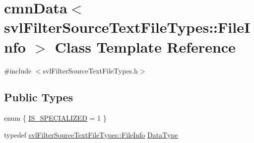 \hypertarget{classcmn_data_3_01svl_filter_source_text_file_types_1_1_file_info_01_4}{}\section{cmn\+Data$<$ svl\+Filter\+Source\+Text\+File\+Types\+:\+:File\+Info $>$ Class Template Reference}
\label{classcmn_data_3_01svl_filter_source_text_file_types_1_1_file_info_01_4}


{\ttfamily \#include $<$svl\+Filter\+Source\+Text\+File\+Types.\+h$>$}

\subsection*{Public Types}
\begin{DoxyCompactItemize}
\item 
enum \{ \hyperlink{classcmn_data_3_01svl_filter_source_text_file_types_1_1_file_info_01_4_ac2667a1a418e7039c6152d3106926eabaa76bfad2562771d868ca2393ab1d17af}{I\+S\+\_\+\+S\+P\+E\+C\+I\+A\+L\+I\+Z\+E\+D} = 1
 \}
\item 
typedef \hyperlink{classsvl_filter_source_text_file_types_1_1_file_info}{svl\+Filter\+Source\+Text\+File\+Types\+::\+File\+Info} \hyperlink{classcmn_data_3_01svl_filter_source_text_file_types_1_1_file_info_01_4_a80103f0f921c89187ac2cadd6fd22d7b}{Data\+Type}
\end{DoxyCompactItemize}
